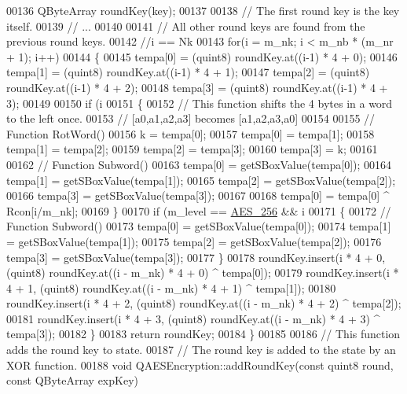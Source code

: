 \begin{DoxyCode}
00136   QByteArray roundKey(key);
00137 
00138   \textcolor{comment}{// The first round key is the key itself.}
00139   \textcolor{comment}{// ...}
00140 
00141   \textcolor{comment}{// All other round keys are found from the previous round keys.}
00142   \textcolor{comment}{//i == Nk}
00143   \textcolor{keywordflow}{for}(i = m\_nk; i < m\_nb * (m\_nr + 1); i++)
00144   \{
00145     tempa[0] = (quint8) roundKey.at((i-1) * 4 + 0);
00146     tempa[1] = (quint8) roundKey.at((i-1) * 4 + 1);
00147     tempa[2] = (quint8) roundKey.at((i-1) * 4 + 2);
00148     tempa[3] = (quint8) roundKey.at((i-1) * 4 + 3);
00149 
00150     \textcolor{keywordflow}{if} (i %
00151     \{
00152         \textcolor{comment}{// This function shifts the 4 bytes in a word to the left once.}
00153         \textcolor{comment}{// [a0,a1,a2,a3] becomes [a1,a2,a3,a0]}
00154 
00155         \textcolor{comment}{// Function RotWord()}
00156         k = tempa[0];
00157         tempa[0] = tempa[1];
00158         tempa[1] = tempa[2];
00159         tempa[2] = tempa[3];
00160         tempa[3] = k;
00161 
00162         \textcolor{comment}{// Function Subword()}
00163         tempa[0] = getSBoxValue(tempa[0]);
00164         tempa[1] = getSBoxValue(tempa[1]);
00165         tempa[2] = getSBoxValue(tempa[2]);
00166         tempa[3] = getSBoxValue(tempa[3]);
00167 
00168         tempa[0] =  tempa[0] ^ Rcon[i/m\_nk];
00169     \}
00170     \textcolor{keywordflow}{if} (m\_level == \hyperlink{class_q_a_e_s_encryption_abe48208f4f6c7d68e6a10b49b9d0b7bdacde97774ab1d4c609e04b0dd13a1e1f7}{AES\_256} && i %
00171     \{
00172         \textcolor{comment}{// Function Subword()}
00173         tempa[0] = getSBoxValue(tempa[0]);
00174         tempa[1] = getSBoxValue(tempa[1]);
00175         tempa[2] = getSBoxValue(tempa[2]);
00176         tempa[3] = getSBoxValue(tempa[3]);
00177     \}
00178     roundKey.insert(i * 4 + 0, (quint8) roundKey.at((i - m\_nk) * 4 + 0) ^ tempa[0]);
00179     roundKey.insert(i * 4 + 1, (quint8) roundKey.at((i - m\_nk) * 4 + 1) ^ tempa[1]);
00180     roundKey.insert(i * 4 + 2, (quint8) roundKey.at((i - m\_nk) * 4 + 2) ^ tempa[2]);
00181     roundKey.insert(i * 4 + 3, (quint8) roundKey.at((i - m\_nk) * 4 + 3) ^ tempa[3]);
00182   \}
00183   \textcolor{keywordflow}{return} roundKey;
00184 \}
00185 
00186 \textcolor{comment}{// This function adds the round key to state.}
00187 \textcolor{comment}{// The round key is added to the state by an XOR function.}
00188 \textcolor{keywordtype}{void} QAESEncryption::addRoundKey(\textcolor{keyword}{const} quint8 round, \textcolor{keyword}{const} QByteArray expKey)

\end{DoxyCode}
